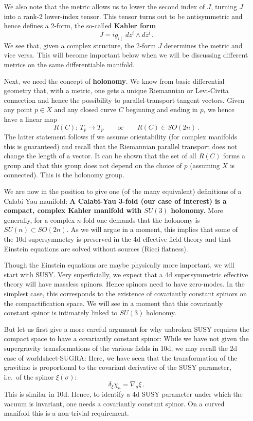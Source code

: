 \documentclass[12pt]{article}
\newcommand{\be}{\begin{equation}}
\newcommand{\ee}{\end{equation}}
\newcommand{\ol}{\overline}
\numberwithin{equation}{section}
\begin{document}
We also note that the metric allows us to lower the second index of $J$, turning $J$ into a rank-2 lower-index tensor. This tensor turns out to be antisymmetric and hence defines a 2-form, the so-called {\bf Kahler form}
\be
J=ig_{i\ol{\jmath}}\,dz^i\wedge d\ol{z}^{\ol{\jmath}}\,.
\ee
We see that, given a complex structure, the 2-form $J$ determines the metric and vice versa. This will become important below when we will be discussing different metrics on the same differentiable manifold. 

Next, we need the concept of {\bf holonomy}. We know from basic differential geometry that, with a metric, one gets a unique Riemannian or Levi-Civita connection and hence the possibility to parallel-transport tangent vectors. Given any point $p\in X$ and any closed curve $C$ beginning and ending in $p$, 
we hence have a linear map 
\be
R(C):\,T_p\to T_p\qquad \mbox{or} \qquad R(C)\in SO(2n)\,.
\ee
The latter statement follows if we assume orientability (for complex manifolds this is guaranteed) and recall that the Riemannian parallel transport does not change the length of a vector. It can be shown that the set of all $R(C)$ forms a group and that this group does not depend on the choice of $p$ (assuming $X$ is connected). This is the holonomy group.

We are now in the position to give one (of the many equivalent) definitions of a Calabi-Yau manifold: {\bf A Calabi-Yau 3-fold (our case of interest) is a compact, complex Kahler manifold with $SU(3)$ holonomy.} More generally, for a complex $n$-fold one demands that the holonomy is $SU(n)\subset SO(2n)$. As we will argue in a moment, this implies that some of the 10d supersymmetry is preserved in the 4d effective field theory and that Einstein equations are solved without sources (Ricci flatness). 

Though the Einstein equations are maybe physically more important, we will start with SUSY. Very superficially, we expect that a 4d supersymmetric effective theory will have massless spinors. Hence spinors need to have zero-modes. In the simplest case, this corresponds to the existence of covariantly constant spinors on the compactification space. We will see in a moment that this covariantly constant spinor is intimately linked to $SU(3)$ holonomy.

But let us first give a more careful argument for why unbroken SUSY requires the compact space to have a covariantly constant spinor: While we have not given the supergravity transformations of the various fields in 10d, we may recall the 2d case of worldsheet-SUGRA: Here, we have seen that the transformation of the gravitino is proportional to the covariant derivative of the SUSY parameter, i.e.~of the spinor $\xi(\sigma)$:
\be
\delta_\xi\chi_a=\nabla_a\xi\,.
\ee
This is similar in 10d. Hence, to identify a 4d SUSY parameter under which the vacuum is invariant, one needs a covariantly constant spinor. On a curved manifold this is a non-trivial requirement. 
\end{document}
